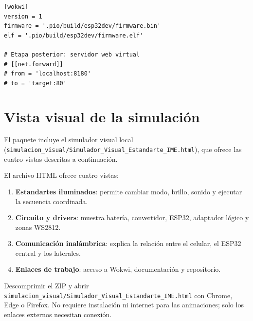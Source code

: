 \documentclass[11pt,a4paper]{article}
\begin{document}
\begin{lstlisting}[style=code,language={},caption={Configuración incluida en wokwi.toml}]
[wokwi]
version = 1
firmware = '.pio/build/esp32dev/firmware.bin'
elf = '.pio/build/esp32dev/firmware.elf'

# Etapa posterior: servidor web virtual
# [[net.forward]]
# from = 'localhost:8180'
# to = 'target:80'
\end{lstlisting}

\section{Vista visual de la simulación}
\begin{successbox}
El paquete incluye el simulador visual local (\texttt{simulacion\_visual/Simulador\_Visual\_Estandarte\_IME.html}), que ofrece las cuatro vistas descritas a continuación.
\end{successbox}

El archivo HTML ofrece cuatro vistas:
\begin{enumerate}
  \item \textbf{Estandartes iluminados}: permite cambiar modo, brillo, sonido y ejecutar la secuencia coordinada.
  \item \textbf{Circuito y drivers}: muestra batería, convertidor, ESP32, adaptador lógico y zonas WS2812.
  \item \textbf{Comunicación inalámbrica}: explica la relación entre el celular, el ESP32 central y los laterales.
  \item \textbf{Enlaces de trabajo}: acceso a Wokwi, documentación y repositorio.
\end{enumerate}

\begin{successbox}
Descomprimir el ZIP y abrir \texttt{simulacion\_visual/Simulador\_Visual\_Estandarte\_IME.html} con Chrome, Edge o Firefox. No requiere instalación ni internet para las animaciones; solo los enlaces externos necesitan conexión.
\end{successbox}

\end{document}
